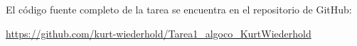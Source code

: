 %

El código fuente completo de la tarea se encuentra en el repositorio de GitHub:

\begin{center}
  \url{https://github.com/kurt-wiederhold/Tarea1_algoco_KurtWiederhold}
\end{center}
